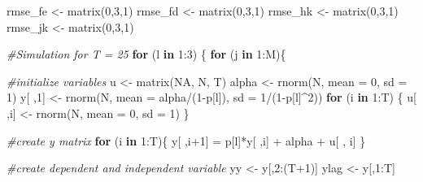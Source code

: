 \documentclass[
]{article}
\newenvironment{Shaded}{\begin{snugshade}}{\end{snugshade}}
\newcommand{\AttributeTok}[1]{\textcolor[rgb]{0.77,0.63,0.00}{#1}}
\newcommand{\CommentTok}[1]{\textcolor[rgb]{0.56,0.35,0.01}{\textit{#1}}}
\newcommand{\ConstantTok}[1]{\textcolor[rgb]{0.00,0.00,0.00}{#1}}
\newcommand{\ControlFlowTok}[1]{\textcolor[rgb]{0.13,0.29,0.53}{\textbf{#1}}}
\newcommand{\DecValTok}[1]{\textcolor[rgb]{0.00,0.00,0.81}{#1}}
\newcommand{\FunctionTok}[1]{\textcolor[rgb]{0.00,0.00,0.00}{#1}}
\newcommand{\NormalTok}[1]{#1}
\newcommand{\OtherTok}[1]{\textcolor[rgb]{0.56,0.35,0.01}{#1}}
\newcommand{\SpecialCharTok}[1]{\textcolor[rgb]{0.00,0.00,0.00}{#1}}
\begin{document}
\begin{Shaded}
\begin{Highlighting}[]
\NormalTok{rmse\_fe }\OtherTok{\textless{}{-}} \FunctionTok{matrix}\NormalTok{(}\DecValTok{0}\NormalTok{,}\DecValTok{3}\NormalTok{,}\DecValTok{1}\NormalTok{)}
\NormalTok{rmse\_fd }\OtherTok{\textless{}{-}} \FunctionTok{matrix}\NormalTok{(}\DecValTok{0}\NormalTok{,}\DecValTok{3}\NormalTok{,}\DecValTok{1}\NormalTok{)}
\NormalTok{rmse\_hk }\OtherTok{\textless{}{-}} \FunctionTok{matrix}\NormalTok{(}\DecValTok{0}\NormalTok{,}\DecValTok{3}\NormalTok{,}\DecValTok{1}\NormalTok{)}
\NormalTok{rmse\_jk }\OtherTok{\textless{}{-}} \FunctionTok{matrix}\NormalTok{(}\DecValTok{0}\NormalTok{,}\DecValTok{3}\NormalTok{,}\DecValTok{1}\NormalTok{)}

\CommentTok{\#Simulation for T = 25}
\ControlFlowTok{for}\NormalTok{ (l }\ControlFlowTok{in} \DecValTok{1}\SpecialCharTok{:}\DecValTok{3}\NormalTok{) \{}
  \ControlFlowTok{for}\NormalTok{ (j }\ControlFlowTok{in} \DecValTok{1}\SpecialCharTok{:}\NormalTok{M)\{}
    
    \CommentTok{\#initialize variables}
\NormalTok{    u }\OtherTok{\textless{}{-}} \FunctionTok{matrix}\NormalTok{(}\ConstantTok{NA}\NormalTok{, N, T)}
\NormalTok{    alpha }\OtherTok{\textless{}{-}} \FunctionTok{rnorm}\NormalTok{(N, }\AttributeTok{mean =} \DecValTok{0}\NormalTok{, }\AttributeTok{sd =} \DecValTok{1}\NormalTok{)}
\NormalTok{    y[ ,}\DecValTok{1}\NormalTok{] }\OtherTok{\textless{}{-}} \FunctionTok{rnorm}\NormalTok{(N, }\AttributeTok{mean =}\NormalTok{ alpha}\SpecialCharTok{/}\NormalTok{(}\DecValTok{1}\SpecialCharTok{{-}}\NormalTok{p[l]), }\AttributeTok{sd =} \DecValTok{1}\SpecialCharTok{/}\NormalTok{(}\DecValTok{1}\SpecialCharTok{{-}}\NormalTok{p[l]}\SpecialCharTok{\^{}}\DecValTok{2}\NormalTok{))}
    \ControlFlowTok{for}\NormalTok{ (i }\ControlFlowTok{in} \DecValTok{1}\SpecialCharTok{:}\NormalTok{T) \{}
\NormalTok{      u[ ,i] }\OtherTok{\textless{}{-}} \FunctionTok{rnorm}\NormalTok{(N, }\AttributeTok{mean =} \DecValTok{0}\NormalTok{, }\AttributeTok{sd =} \DecValTok{1}\NormalTok{)}
\NormalTok{    \}}
    
    \CommentTok{\#create y matrix}
    \ControlFlowTok{for}\NormalTok{ (i }\ControlFlowTok{in} \DecValTok{1}\SpecialCharTok{:}\NormalTok{T)\{}
\NormalTok{      y[ ,i}\SpecialCharTok{+}\DecValTok{1}\NormalTok{] }\OtherTok{=}\NormalTok{ p[l]}\SpecialCharTok{*}\NormalTok{y[ ,i] }\SpecialCharTok{+}\NormalTok{ alpha }\SpecialCharTok{+}\NormalTok{ u[ , i]}
\NormalTok{    \}}
    
    \CommentTok{\#create dependent and independent variable}
\NormalTok{    yy }\OtherTok{\textless{}{-}}\NormalTok{ y[,}\DecValTok{2}\SpecialCharTok{:}\NormalTok{(T}\SpecialCharTok{+}\DecValTok{1}\NormalTok{)]}
\NormalTok{    ylag }\OtherTok{\textless{}{-}}\NormalTok{ y[,}\DecValTok{1}\SpecialCharTok{:}\NormalTok{T]}
    

\end{Highlighting}
\end{Shaded}
\end{document}
